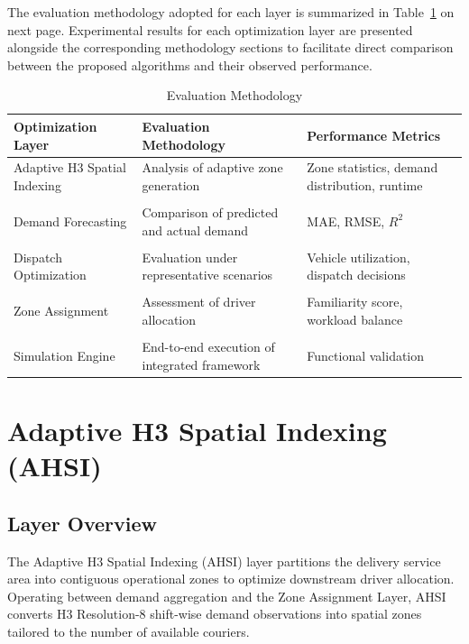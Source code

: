 \documentclass{article}
\begin{document}
The evaluation methodology adopted for each layer is summarized in Table~\ref{tab:evaluation_methodology} on next page. Experimental results for each optimization layer are presented alongside the corresponding methodology sections to facilitate direct comparison between the proposed algorithms and their observed performance.

\begin{table}[htbp]
\centering
\caption{Evaluation Methodology}
\label{tab:evaluation_methodology}
\begin{tabularx}{\textwidth}{>{\raggedright\arraybackslash}p{} >{\raggedright\arraybackslash}X >{\raggedright\arraybackslash}X}
\hline
\textbf{Optimization Layer} & \textbf{Evaluation Methodology} & \textbf{Performance Metrics} \\
\hline
Adaptive H3 Spatial Indexing & Analysis of adaptive zone generation & Zone statistics, demand distribution, runtime \\ \\
Demand Forecasting & Comparison of predicted and actual demand & MAE, RMSE, $R^2$ \\ \\
Dispatch Optimization & Evaluation under representative scenarios & Vehicle utilization, dispatch decisions \\ \\
Zone Assignment & Assessment of driver allocation & Familiarity score, workload balance \\ \\
Simulation Engine & End-to-end execution of integrated framework & Functional validation \\
\hline
\end{tabularx}
\end{table}



\newpage

\section{Adaptive H3 Spatial Indexing (AHSI)}
\subsection{Layer Overview}
\label{subsec:ahsi_layer_overview}

The Adaptive H3 Spatial Indexing (AHSI) layer partitions the delivery service area into contiguous operational zones to optimize downstream driver allocation. Operating between demand aggregation and the Zone Assignment Layer, AHSI converts H3 Resolution-8 shift-wise demand observations into spatial zones tailored to the number of available couriers.
\end{document}
